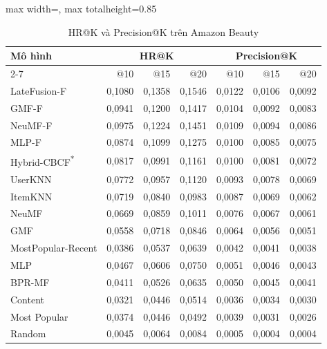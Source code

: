 \begin{table}[H]
    \centering\small\setlength{\tabcolsep}{4pt}
    \caption{HR@K và Precision@K trên Amazon Beauty}
    \label{tab:amzk2}
    \begin{adjustbox}{max width=\textwidth, max totalheight=0.85\textheight}
    \begin{tabular}{|l|r|r|r|r|r|r|}
        \hline
        \multirow{2}{*}{Mô hình} & \multicolumn{3}{c|}{HR@K} & \multicolumn{3}{c|}{Precision@K} \\ \cline{2-7}
         & @10 & @15 & @20 & @10 & @15 & @20 \\ \hline
        LateFusion-F & 0{,}1080 & 0{,}1358 & 0{,}1546 & 0{,}0122 & 0{,}0106 & 0{,}0092 \\ \hline
        GMF-F & 0{,}0941 & 0{,}1200 & 0{,}1417 & 0{,}0104 & 0{,}0092 & 0{,}0083 \\ \hline
        NeuMF-F & 0{,}0975 & 0{,}1224 & 0{,}1451 & 0{,}0109 & 0{,}0094 & 0{,}0086 \\ \hline
        MLP-F & 0{,}0874 & 0{,}1099 & 0{,}1275 & 0{,}0100 & 0{,}0085 & 0{,}0075 \\ \hline
        Hybrid-CBCF\textsuperscript{*} & 0{,}0817 & 0{,}0991 & 0{,}1161 & 0{,}0100 & 0{,}0081 & 0{,}0072 \\ \hline
        UserKNN & 0{,}0772 & 0{,}0957 & 0{,}1120 & 0{,}0093 & 0{,}0078 & 0{,}0069 \\ \hline
        ItemKNN & 0{,}0719 & 0{,}0840 & 0{,}0983 & 0{,}0087 & 0{,}0069 & 0{,}0062 \\ \hline
        NeuMF & 0{,}0669 & 0{,}0859 & 0{,}1011 & 0{,}0076 & 0{,}0067 & 0{,}0061 \\ \hline
        GMF & 0{,}0558 & 0{,}0718 & 0{,}0846 & 0{,}0064 & 0{,}0056 & 0{,}0051 \\ \hline
        MostPopular-Recent & 0{,}0386 & 0{,}0537 & 0{,}0639 & 0{,}0042 & 0{,}0041 & 0{,}0038 \\ \hline
        MLP & 0{,}0467 & 0{,}0606 & 0{,}0750 & 0{,}0051 & 0{,}0046 & 0{,}0043 \\ \hline
        BPR-MF & 0{,}0411 & 0{,}0526 & 0{,}0635 & 0{,}0050 & 0{,}0045 & 0{,}0041 \\ \hline
        Content & 0{,}0321 & 0{,}0446 & 0{,}0514 & 0{,}0036 & 0{,}0034 & 0{,}0030 \\ \hline
        Most Popular & 0{,}0374 & 0{,}0446 & 0{,}0492 & 0{,}0039 & 0{,}0031 & 0{,}0026 \\ \hline
        Random & 0{,}0045 & 0{,}0064 & 0{,}0084 & 0{,}0005 & 0{,}0004 & 0{,}0004 \\ \hline
    \end{tabular}
    \end{adjustbox}
\end{table}
